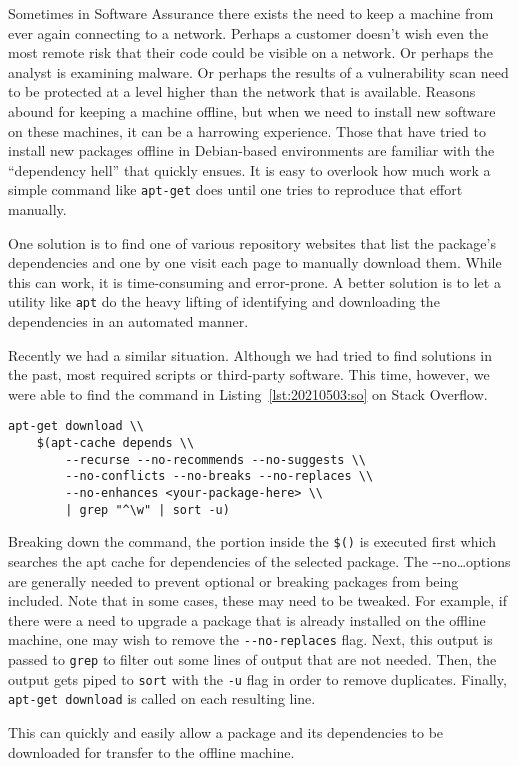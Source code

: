 Sometimes in Software Assurance there exists the need to keep a machine from ever again connecting to a network. Perhaps a customer doesn't wish even the most remote risk that their code could be visible on a network. Or perhaps the analyst is examining malware. Or perhaps the results of a vulnerability scan need to be protected at a level higher than the network that is available. Reasons abound for keeping a machine offline, but when we need to install new software on these machines, it can be a harrowing experience. Those that have tried to install new packages offline in Debian-based environments are familiar with the ``dependency hell'' that quickly ensues. It is easy to overlook how much work a simple command like \texttt{apt-get} does until one tries to reproduce that effort manually.

One solution is to find one of various repository websites that list the package's dependencies and one by one visit each page to manually download them. While this can work, it is time-consuming and error-prone. A better solution is to let a utility like \texttt{apt} do the heavy lifting of identifying and downloading the dependencies in an automated manner.

Recently we had a similar situation. Although we had tried to find solutions in the past, most required scripts or third-party software. This time, however, we were able to find the command in Listing~\ref{lst:20210503:so} on Stack Overflow.\autocite{20210503-stackoverflow}

\begin{lstlisting}[caption={Deep Dependency Downloading},captionpos=b,style=BashStyle,basicstyle=\small,label={lst:20210503:so},literate=*{-}{-}1]
apt-get download \\
	$(apt-cache depends \\
		--recurse --no-recommends --no-suggests \\
		--no-conflicts --no-breaks --no-replaces \\
		--no-enhances <your-package-here> \\
		| grep "^\w" | sort -u)
\end{lstlisting}

Breaking down the command, the portion inside the \texttt{\$()} is executed first which searches the apt cache for dependencies of the selected package. The -\phantom{}-no\ldots options are generally needed to prevent optional or breaking packages from being included. Note that in some cases, these may need to be tweaked. For example, if there were a need to upgrade a package that is already installed on the offline machine, one may wish to remove the \texttt{-\phantom{}-no-replaces} flag. Next, this output is passed to \texttt{grep} to filter out some lines of output that are not needed. Then, the output gets piped to \texttt{sort} with the \texttt{-u} flag in order to remove duplicates. Finally, \texttt{apt-get download} is called on each resulting line.

This can quickly and easily allow a package and its dependencies to be downloaded for transfer to the offline machine.
